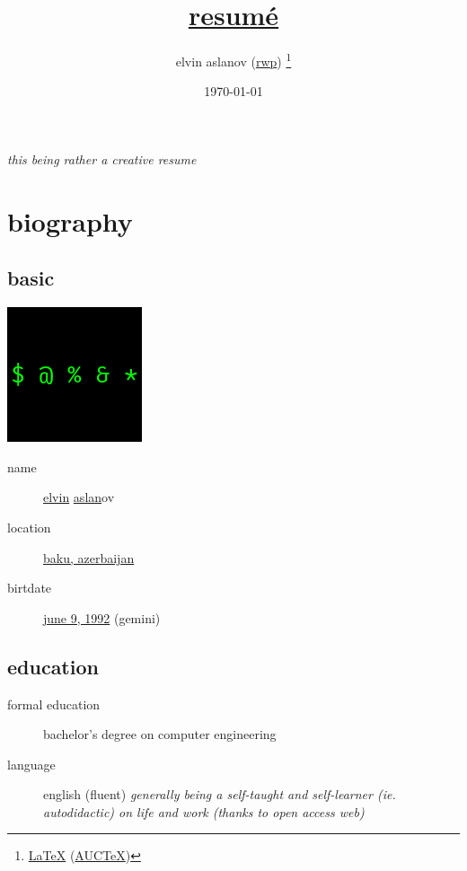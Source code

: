 \documentclass{article}
\title{\href{https://github.com/rwp0/resume}{resumé}}
\author{elvin aslanov (\href{https://rwp0.github.io/}{rwp}) \thanks{\href{https://en.wikipedia.org/wiki/LaTeX}{\LaTeX} (\href{https://www.gnu.org/software/auctex/}{AUCTeX})}}
\date{\today}
\begin{document}
  \begin{titlepage}
    \maketitle
  \end{titlepage}
  \textit{this being rather a creative resume}

  \section{biography}
    \subsection{basic}
    \includegraphics{resume.png}
      \begin{description}
      \item[name] \href{https://en.wiktionary.org/wiki/Elvin}{elvin} \href{https://en.wiktionary.org/wiki/Aslan}{aslan}ov
        \item[location] \href{https://www.openstreetmap.org/relation/2415335}{baku, azerbaijan}
        \item[birtdate] \href{https://www.timeanddate.com/date/durationresult.html?m1=06&d1=09&y1=1992}{june 9, 1992} (gemini)
      \end{description}
    \subsection{education}
      \begin{description}
        \item[formal education] bachelor's degree on computer engineering
        \item[language] english (fluent)
          \textit{generally being a self-taught and self-learner (ie. autodidactic) on life and work (thanks to open access web)}
      \end{description}
\end{document}
